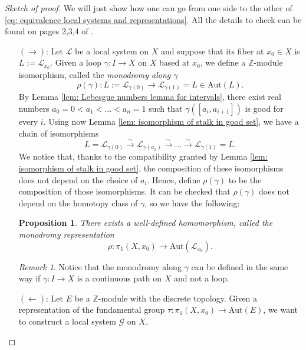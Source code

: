 \documentclass[a4paper,12 pt,titlepage,twoside]{book}
\newcommand{\numberset}{\mathbb}
\newcommand{\Z}{\numberset{Z}}
\newcommand{\ls}{\mathcal{L}}
\theoremstyle{plain}
\theoremstyle{theorem}
\newtheorem{prop}[thm]{Proposition}
\theoremstyle{definition}
\theoremstyle{remark}
\newtheorem{oss}[thm]{Remark}
\begin{document}
\begin{proof}[Sketch of proof]
	We will just show how one can go from one side to the other of \eqref{eq: equivalence local systems and representations}. All the details to check can be found on pages 2,3,4 of \cite{achar_2007}.
	\begin{itemize}
		\item[$(\rightarrow)$: ] Let $\ls$ be a local system on $X$ and suppose that its fiber at $x_0\in X$ is $L := \ls_{x_0}$. Given a loop $\gamma \colon I \rightarrow X$ on $X$ based at $x_0$, we define a $\Z$-module isomorphism, called the \emph{monodromy along $\gamma$} $$\rho(\gamma) \colon L :=\ls_{\gamma(0)} \rightarrow \ls_{\gamma(1)} = L \in \text{Aut}(L).$$
			By Lemma \ref{lem: Lebesgue numbers lemma for intervals}, there exist real numbers $a_0=0 < a_1 < \dots < a_n=1$ such that $\gamma([a_i,a_{i+1}])$ is good for every $i$. Using now Lemma \ref{lem: isomorphism of stalk in good set}, we have a chain of isomorphisms $$L = \ls_{\gamma(0)} \stackrel{\sim}{\longrightarrow} \ls_{\gamma(a_1)} \stackrel{\sim}{\longrightarrow} \dots \stackrel{\sim}{\longrightarrow} \ls_{\gamma(1)} =L.$$ We notice that, thanks to the compatibility granted by Lemma  \ref{lem: isomorphism of stalk in good set}, the composition of these isomorphisms does not depend on the choice of $a_i$. Hence, define $\rho(\gamma)$ to be the composition of those isomorphisms. It can be checked that $\rho(\gamma)$ does not depend on the homotopy class of $\gamma$, so we have the following:
			\begin{prop}\label{cor: from local system to representations}
				There exists a well-defined homomorphism, called the \emph{monodromy representation} $$\rho \colon \pi_1(X,x_0) \rightarrow \text{Aut}(\ls_{x_0}).$$
			\end{prop}
		\begin{oss}
			Notice that the monodromy along $\gamma$ can be defined in the same way if $\gamma \colon I \rightarrow X$ is a continuous path on $X$ and not a loop.
		\end{oss}
		\item[$(\leftarrow)$: ] Let $E$ be a $\Z$-module with the discrete topology. Given a representation of the fundamental group $\tau \colon \pi_1(X,x_0) \rightarrow \text{Aut}(E)$, we want to construct a local system $\mathcal{G}$ on $X$. 
		

\end{itemize}
\end{proof}
\end{document}
